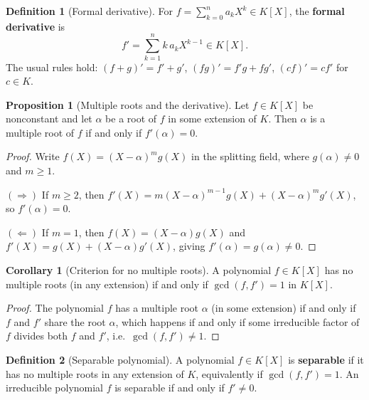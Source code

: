 \documentclass[12pt,a4paper,openany]{book}
\theoremstyle{definition}
\newtheorem{definition}{Definition}[chapter]
\newtheorem{proposition}{Proposition}[chapter]
\newtheorem{corollary}{Corollary}[chapter]
\theoremstyle{remark}
\begin{document}
\begin{definition}[Formal derivative]
\label{def:formal-derivative}
For $f = \sum_{k=0}^n a_k X^k \in K[X]$, the \textbf{formal
derivative} is
\[
  f' = \sum_{k=1}^n k\, a_k X^{k-1} \in K[X].
\]
The usual rules hold: $(f+g)' = f' + g'$, $(fg)' = f'g + fg'$,
$(cf)' = cf'$ for $c \in K$.
\end{definition}

\begin{proposition}[Multiple roots and the derivative]
\label{prop:multiple-root-derivative}
Let $f \in K[X]$ be nonconstant and let $\alpha$ be a root of $f$ in
some extension of $K$. Then $\alpha$ is a multiple root of $f$ if and
only if $f'(\alpha) = 0$.
\end{proposition}

\begin{proof}
Write $f(X) = (X - \alpha)^m g(X)$ in the splitting field, where
$g(\alpha) \ne 0$ and $m \ge 1$.

$(\Rightarrow)$ If $m \ge 2$, then
$f'(X) = m(X-\alpha)^{m-1}g(X) + (X-\alpha)^m g'(X)$, so
$f'(\alpha) = 0$.

$(\Leftarrow)$ If $m = 1$, then
$f(X) = (X-\alpha)g(X)$ and
$f'(X) = g(X) + (X-\alpha)g'(X)$, giving
$f'(\alpha) = g(\alpha) \ne 0$.
\end{proof}

\begin{corollary}[Criterion for no multiple roots]
\label{cor:no-multiple-roots}
A polynomial $f \in K[X]$ has no multiple roots (in any extension) if
and only if $\gcd(f, f') = 1$ in $K[X]$.
\end{corollary}

\begin{proof}
The polynomial $f$ has a multiple root $\alpha$ (in some extension) if
and only if $f$ and $f'$ share the root $\alpha$, which happens if and
only if some irreducible factor of $f$ divides both $f$ and $f'$,
i.e.\ $\gcd(f, f') \ne 1$.
\end{proof}

\begin{definition}[Separable polynomial]
\label{def:separable-poly}
A polynomial $f \in K[X]$ is \textbf{separable} if it has no multiple
roots in any extension of $K$, equivalently if $\gcd(f, f') = 1$.
An irreducible polynomial $f$ is separable if and only if $f' \ne 0$.
\end{definition}
\end{document}
